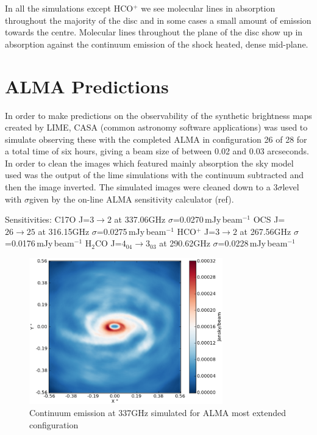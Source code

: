 \documentclass[useAMS,usenatbib]{mn2e}
\begin{document}
In all the simulations except HCO$^+$ we see molecular lines in absorption throughout the majority of the disc and in some cases a small amount of emission towards the centre. Molecular lines throughout the plane of the disc show up in absorption against the continuum emission of the shock heated, dense mid-plane. 





\section{ALMA Predictions} \label{sec:alma_predictions}

In order to make predictions on the observability of the synthetic brightness maps created by LIME, CASA (common astronomy software applications) was used to simulate observing these with the completed ALMA in configuration 26 of 28 for a total time of six hours, giving a beam size of between 0.02 and 0.03 arcseconds. In order to clean the images which featured mainly absorption the sky model used was the output of the lime simulations with the continuum subtracted and then the image inverted. The simulated images were cleaned down to a 3$\sigma$level with $\sigma$given by the on-line ALMA sensitivity calculator (ref).

Sensitivities:
C17O J=$3\rightarrow2$ at 337.06GHz $\sigma$=0.0270$\,$mJy$\,$beam$^{-1}$
OCS J=$26\rightarrow25$ at 316.15GHz $\sigma$=0.0275$\,$mJy$\,$beam$^{-1}$
HCO$^+$ J=$3\rightarrow2$ at 267.56GHz $\sigma$=0.0176$\,$mJy$\,$beam$^{-1}$
H$_2$CO J=$4_{04}\rightarrow3_{03}$ at 290.62GHz $\sigma$=0.0228$\,$mJy$\,$beam$^{-1}$

\begin{figure}
 \includegraphics[width=84mm]{Figures/sim/casa_cont_337GHz.eps}

 \caption{Continuum emission at 337GHz simulated for ALMA most extended configuration}
\end{figure}
\end{document}

